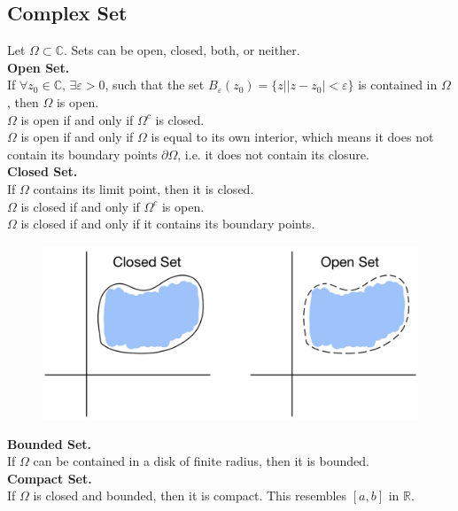 \documentclass[11pt]{article}
\begin{document}
\subsection{Complex Set} 
Let $\Omega \subset \mathbb{C}$. Sets can be open, closed, both, or neither. \\
\newline
\textbf{Open Set.} \\ 
If $\forall$$z_0 \in \mathbb{C}$,  $\exists \varepsilon > 0$, such that the set $B_\varepsilon(z_0) = \{z||z - z_0| < \varepsilon\}$ is contained in $\Omega$, then $\Omega$ is open. \\
$\Omega$ is open if and only if $\Omega^c$ is closed. \\ 
$\Omega$ is open if and only if $\Omega$ is equal to its own interior, which means it does not contain its boundary points $\partial \Omega$, i.e. it does not contain its closure. \\
\newline
\textbf{Closed Set.} \\ 
If $\Omega$ contains its limit point, then it is closed. \\
$\Omega$ is closed if and only if $\Omega^c$ is open. \\ 
$\Omega$ is closed if and only if it contains its boundary points. \\
\begin{figure}[H]
\includegraphics[scale = 0.19]{4_1}
\centering
\end{figure}
\textbf{Bounded Set.}\\
If $\Omega$ can be contained in a disk of finite radius, then it is bounded. \\
\newline
\textbf{Compact Set.} \\ 
If $\Omega$ is closed and bounded, then it is compact. This resembles $[a, b]$ in $\mathbb{R}$. \\
\newline
$$
\end{document}
